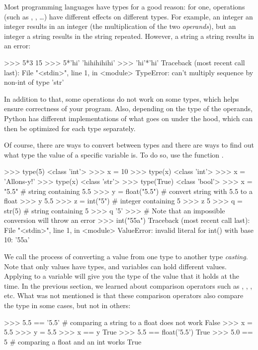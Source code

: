 \documentclass[11pt]{cselabheader}
\begin{document}
Most programming languages have types for a good reason: for one, operations
(such as \pythoninline{+}, \pythoninline{-}, \ldots) have different effects on
different types. For example, an integer \pythoninline{*} an integer results in
an integer (the multiplication of the two \emph{operands}), but an integer
\pythoninline{*} a string results in the string repeated. However, a string
\pythoninline{*} a string results in an error:
\begin{pyconcode}
>>> 5*3
15
>>> 5*'hi'
'hihihihihi'
>>> 'hi'*'hi'
Traceback (most recent call last):
  File "<stdin>", line 1, in <module>
TypeError: can't multiply sequence by non-int of type 'str'
\end{pyconcode}

In addition to that, some operations do not work on some types, which helps
ensure correctness of your program. Also, depending on the type of the operands,
Python has different implementations of what goes on under the hood, which can
then be optimized for each type separately.

Of course, there are ways to convert between types and there are ways to find
out what type the value of a specific variable is. To do so, use the function
.
\begin{pyconcode}
>>> type(5)
<class 'int'>
>>> x = 10
>>> type(x)
<class 'int'>
>>> x = 'Allons-y!'
>>> type(x)
<class 'str'>
>>> type(True)
<class 'bool'>
>>> x = "5.5" # string containing 5.5
>>> y = float("5.5") # convert string with 5.5 to a float
>>> y
5.5
>>> z = int("5") # integer containing 5
>>> z
5
>>> q = str(5) # string containing 5
>>> q
'5'
>>> # Note that an impossible conversion will throw an error
>>> int("55a")
Traceback (most recent call last):
  File "<stdin>", line 1, in <module>
ValueError: invalid literal for int() with base 10: '55a'
\end{pyconcode}

We call the process of converting a value from one type to another type
\emph{casting}. Note that only values have types, and variables can hold
different values.  Applying  to a variable will give you
the type of the value that it holds at the time. In the previous section, we
learned about comparison operators such as \pythoninline{!=}, \pythoninline{<},
\pythoninline{>}, etc. What was not mentioned is that these comparison operators
also compare the type in some cases, but not in others:
\begin{pyconcode}
>>> 5.5 == '5.5' # comparing a string to a float does not work
False
>>> x = 5.5
>>> y = 5.5
>>> x == y
True
>>> 5.5 == float('5.5')
True
>>> 5.0 == 5 # comparing a float and an int works
True
\end{pyconcode}
\end{document}

